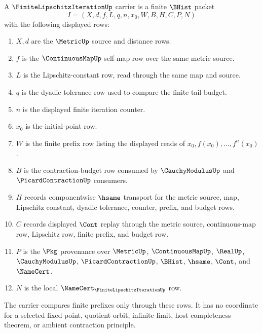 \begin{definition}
\label{def:finite-lipschitz-iteration-carrier}
A $\FiniteLipschitzIterationUp$ carrier is a finite $\BHist$ packet
$$
I=(X,d,f,L,q,n,x_0,W,B,H,C,P,N)
$$
with the following displayed rows:
\begin{enumerate}
\item $X,d$ are the $\MetricUp$ source and distance rows.
\item $f$ is the $\ContinuousMapUp$ self-map row over the same metric source.
\item $L$ is the Lipschitz-constant row, read through the same map and source.
\item $q$ is the dyadic tolerance row used to compare the finite tail budget.
\item $n$ is the displayed finite iteration counter.
\item $x_0$ is the initial-point row.
\item $W$ is the finite prefix row listing the displayed reads of $x_0,f(x_0),\ldots,f^n(x_0)$.
\item $B$ is the contraction-budget row consumed by $\CauchyModulusUp$ and $\PicardContractionUp$ consumers.
\item $H$ records componentwise $\hsame$ transport for the metric source, map, Lipschitz constant, dyadic tolerance, counter, prefix, and budget rows.
\item $C$ records displayed $\Cont$ replay through the metric source, continuous-map row, Lipschitz row, finite prefix, and budget row.
\item $P$ is the $\Pkg$ provenance over $\MetricUp$, $\ContinuousMapUp$, $\RealUp$, $\CauchyModulusUp$, $\PicardContractionUp$, $\BHist$, $\hsame$, $\Cont$, and $\NameCert$.
\item $N$ is the local $\NameCert_{\FiniteLipschitzIterationUp}$ row.
\end{enumerate}
The carrier compares finite prefixes only through these rows. It has no coordinate for a selected fixed point, quotient orbit, infinite limit, host completeness theorem, or ambient contraction principle.
\end{definition}

